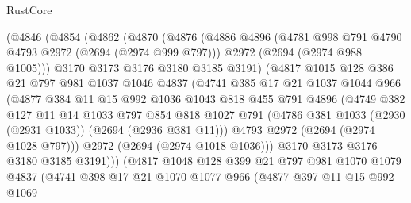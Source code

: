 \begin{lexlean}{RustCore}
\begin{coremodule}
          (@4846
            (@4854
              (@4862
                (@4870
                  (@4876
                    (@4886
                      @4896
                      (@4781 @998 @791 @4790 @4793 @2972 (@2694 (@2974 @999 @797)))
                      @2972
                      (@2694 (@2974 @988 @1005)))
                    @3170
                    @3173
                    @3176
                    @3180
                    @3185
                    @3191)
                  (@4817
                    @1015
                    @128
                    @386
                    @21
                    @797
                    @981
                    @1037
                    @1046
                    @4837
                    (@4741
                      @385
                      @17
                      @21
                      @1037
                      @1044
                      @966
                      (@4877
                        @384
                        @11
                        @15
                        @992
                        @1036
                        @1043
                        @818
                        @455
                        @791
                        @4896
                        (@4749
                          @382
                          @127
                          @11
                          @14
                          @1033
                          @797
                          @854
                          @818
                          @1027
                          @791
                          (@4786 @381 @1033 (@2930 (@2931 @1033)) (@2694 (@2936 @381 @11)))
                          @4793
                          @2972
                          (@2694 (@2974 @1028 @797)))
                        @2972
                        (@2694 (@2974 @1018 @1036)))
                      @3170
                      @3173
                      @3176
                      @3180
                      @3185
                      @3191)))
                (@4817
                  @1048
                  @128
                  @399
                  @21
                  @797
                  @981
                  @1070
                  @1079
                  @4837
                  (@4741
                    @398
                    @17
                    @21
                    @1070
                    @1077
                    @966
                    (@4877
                      @397
                      @11
                      @15
                      @992
                      @1069

\end{coremodule}
\end{lexlean}
